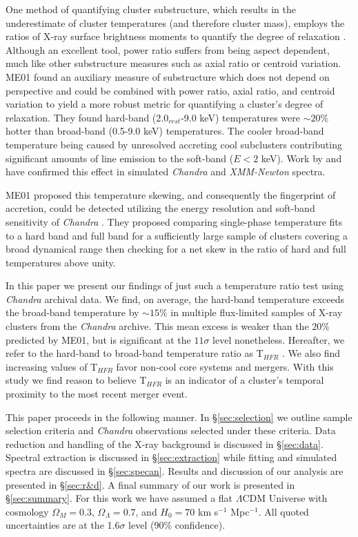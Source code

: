 \documentclass{emulateapj}
\newcommand{\tf}{T$_{HFR}$ }
\newcommand{\chan}{{\textit{Chandra }}}
\begin{document}
One method of quantifying cluster substructure, which results in the  
underestimate of cluster temperatures (and therefore cluster mass),
employs the ratios of X-ray surface brightness moments to quantify the
degree of relaxation \citep{1995ApJ...452..522B, 1996ApJ...458...27B,
2005ApJ...624..606J}. Although an excellent tool, power ratio suffers
from being aspect dependent, much like other substructure measures
such as axial ratio or centroid variation. ME01 found an auxiliary
measure of substructure which does not depend on perspective and could
be combined with power ratio, axial ratio, and centroid variation to
yield a more robust metric for quantifying a cluster's degree of
relaxation. They found hard-band (2.0$_{rest}$-9.0 keV) temperatures
were $\sim 20\%$ hotter than broad-band (0.5-9.0 keV)
temperatures. The cooler broad-band temperature being caused by
unresolved accreting cool subclusters contributing significant amounts
of line emission to the soft-band ($E<2$ keV). Work by
\cite{2004MNRAS.354...10M} and \cite{2006ApJ...640..710V} have
confirmed this effect in simulated \chan and
{\textit{XMM-Newton}} spectra.

ME01 proposed this temperature skewing, and consequently the
fingerprint of accretion, could be detected utilizing the energy
resolution and soft-band sensitivity of \chan. They
proposed comparing single-phase temperature fits to a hard band and
full band for a sufficiently large sample of clusters covering a broad
dynamical range then checking for a net skew in the ratio of hard and
full temperatures above unity.

In this paper we present our findings of just such a temperature ratio
test using \chan archival data. We find, on average, the
hard-band temperature exceeds the broad-band temperature by $\sim15\%$
in multiple flux-limited samples of X-ray clusters from the \chan
archive. This mean excess is weaker than the $20\%$
predicted by ME01, but is significant at the $11\sigma$ level
nonetheless. Hereafter, we refer to the hard-band to broad-band
temperature ratio as \tf. We also find increasing values of \tf favor
non-cool core systems and mergers. With this study we find reason to
believe \tf is an indicator of a cluster's temporal proximity to
the most recent merger event.

This paper proceeds in the following manner. In \S\ref{sec:selection}
we outline sample selection criteria and \chan
observations selected under these criteria. Data reduction and
handling of the X-ray background is discussed in
\S\ref{sec:data}. Spectral extraction is discussed in
\S\ref{sec:extraction} while fitting and simulated spectra are
discussed in \S\ref{sec:specan}. Results and discussion of our
analysis are presented in \S\ref{sec:r&d}. A final summary of our work
is presented in \S\ref{sec:summary}. For this work we have assumed a
flat $\Lambda$CDM Universe with cosmology $\Omega_{M} = 0.3$,
$\Omega_{\Lambda} = 0.7$, and $H_{0} = 70$ km s$^{-1}$ Mpc$^{-1}$. All
quoted uncertainties are at the 1.6$\sigma$ level (90\% confidence).
\end{document}
